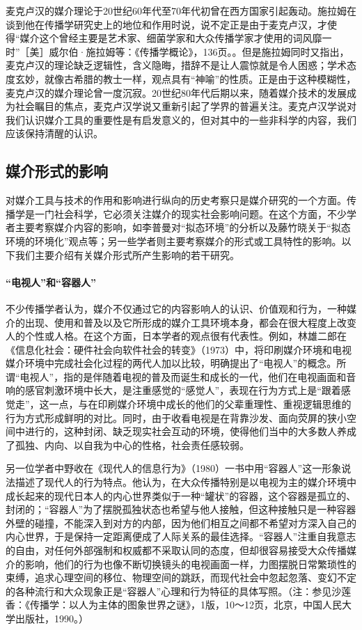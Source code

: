 \documentclass[UTF8,12pt]{ctexart}
\numberwithin{equation}{section} %
\numberwithin{figure}{section}
\numberwithin{table}{section}
\begin{document}
	麦克卢汉的媒介理论于20世纪60年代至70年代初曾在西方国家引起轰动。施拉姆在谈到他在传播学研究史上的地位和作用时说，说不定正是由于麦克卢汉，才使得“媒介这个曾经主要是艺术家、细菌学家和大众传播学家才使用的词风靡一时”［美］威尔伯·施拉姆等：《传播学概论》，136页。。但是施拉姆同时又指出，麦克卢汉的理论缺乏逻辑性，含义隐晦，措辞不是让人震惊就是令人困惑；学术态度玄妙，就像古希腊的教士一样，观点具有“神喻”的性质。正是由于这种模糊性，麦克卢汉的媒介理论曾一度沉寂。20世纪80年代后期以来，随着媒介技术的发展成为社会瞩目的焦点，麦克卢汉学说又重新引起了学界的普遍关注。麦克卢汉学说对我们认识媒介工具的重要性是有启发意义的，但对其中的一些非科学的内容，我们应该保持清醒的认识。
	
	
	\subsection{媒介形式的影响}
	
	
	对媒介工具与技术的作用和影响进行纵向的历史考察只是媒介研究的一个方面。传播学是一门社会科学，它必须关注媒介的现实社会影响问题。在这个方面，不少学者主要考察媒介内容的影响，如李普曼对“拟态环境”的分析以及藤竹晓关于“拟态环境的环境化”观点等；另一些学者则主要考察媒介的形式或工具特性的影响。以下我们主要介绍有关媒介形式所产生影响的若干研究。
	
	\paragraph{“电视人”和“容器人”}
	
	不少传播学者认为，媒介不仅通过它的内容影响人的认识、价值观和行为，一种媒介的出现、使用和普及以及它所形成的媒介工具环境本身，都会在很大程度上改变人的个性或人格。在这个方面，日本学者的观点很有代表性。例如，林雄二郎在《信息化社会：硬件社会向软件社会的转变》（1973）中，将印刷媒介环境和电视媒介环境中完成社会化过程的两代人加以比较，明确提出了“电视人”的概念。所谓“电视人”，指的是伴随着电视的普及而诞生和成长的一代，他们在电视画面和音响的感官刺激环境中长大，是注重感觉的“感觉人”，表现在行为方式上是“跟着感觉走”，这一点，与在印刷媒介环境中成长的他们的父辈重理性、重视逻辑思维的行为方式形成鲜明的对比。同时，由于收看电视是在背靠沙发、面向荧屏的狭小空间中进行的，这种封闭、缺乏现实社会互动的环境，使得他们当中的大多数人养成了孤独、内向、以自我为中心的性格，社会责任感较弱。
	
	另一位学者中野收在《现代人的信息行为》（1980）一书中用“容器人”这一形象说法描述了现代人的行为特点。他认为，在大众传播特别是以电视为主的媒介环境中成长起来的现代日本人的内心世界类似于一种“罐状”的容器，这个容器是孤立的、封闭的；“容器人”为了摆脱孤独状态也希望与他人接触，但这种接触只是一种容器外壁的碰撞，不能深入到对方的内部，因为他们相互之间都不希望对方深入自己的内心世界，于是保持一定距离便成了人际关系的最佳选择。“容器人”注重自我意志的自由，对任何外部强制和权威都不采取认同的态度，但却很容易接受大众传播媒介的影响，他们的行为也像不断切换镜头的电视画面一样，力图摆脱日常繁琐性的束缚，追求心理空间的移位、物理空间的跳跃，而现代社会中忽起忽落、变幻不定的各种流行和大众现象正是“容器人”心理和行为特征的具体写照。（注：参见沙莲香：《传播学：以人为主体的图象世界之谜》，1版，10～12页，北京，中国人民大学出版社，1990。）
	
\end{document}
